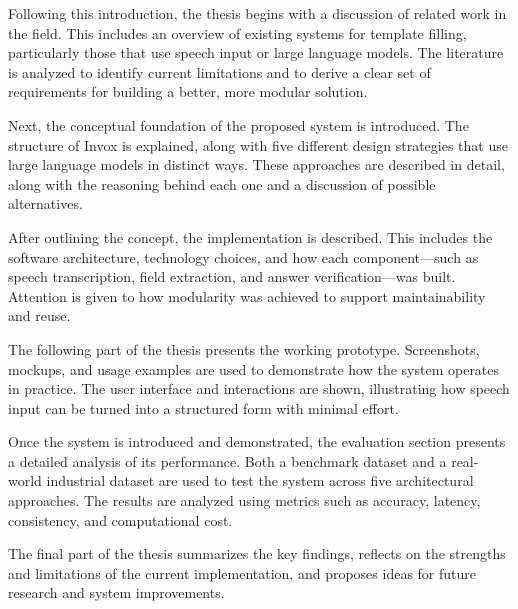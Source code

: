 Following this introduction, the thesis begins with a discussion of related work in the field. This includes an overview of existing systems for template filling, particularly those that use speech input or large language models. The literature is analyzed to identify current limitations and to derive a clear set of requirements for building a better, more modular solution.

Next, the conceptual foundation of the proposed system is introduced. The structure of Invox is explained, along with five different design strategies that use large language models in distinct ways. These approaches are described in detail, along with the reasoning behind each one and a discussion of possible alternatives.

After outlining the concept, the implementation is described. This includes the software architecture, technology choices, and how each component—such as speech transcription, field extraction, and answer verification—was built. Attention is given to how modularity was achieved to support maintainability and reuse.

The following part of the thesis presents the working prototype. Screenshots, mockups, and usage examples are used to demonstrate how the system operates in practice. The user interface and interactions are shown, illustrating how speech input can be turned into a structured form with minimal effort.

Once the system is introduced and demonstrated, the evaluation section presents a detailed analysis of its performance. Both a benchmark dataset and a real-world industrial dataset are used to test the system across five architectural approaches. The results are analyzed using metrics such as accuracy, latency, consistency, and computational cost.

The final part of the thesis summarizes the key findings, reflects on the strengths and limitations of the current implementation, and proposes ideas for future research and system improvements.
